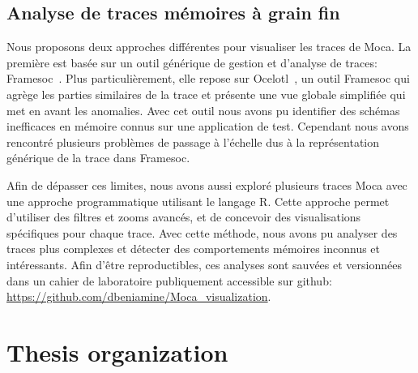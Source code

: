 \subsection*{Analyse de traces mémoires à grain fin}

Nous proposons deux approches différentes pour visualiser les traces de \gls{Moca}.
La première est basée sur un outil générique de gestion et d'analyse de traces: \gls{Framesoc}~\cite{Pagano14frameSoC}.
Plus particulièrement, elle repose sur \gls{Ocelotl}~\cite{Dosimont14Ocelotl}, un outil \gls{Framesoc} qui agrège les parties similaires de la trace et présente une vue globale simplifiée qui met en avant les anomalies.
Avec cet outil nous avons pu identifier des schémas inefficaces en mémoire connus sur une application de test.
Cependant nous avons rencontré plusieurs problèmes de passage à l'échelle dus à la représentation générique de la trace dans \gls{Framesoc}.

Afin de dépasser ces limites, nous avons aussi exploré plusieurs traces \gls{Moca} avec une approche programmatique utilisant le langage \gls{R}.
Cette approche permet d'utiliser des filtres et zooms avancés, et de concevoir des visualisations spécifiques pour chaque trace.
Avec cette méthode, nous avons pu analyser des traces plus complexes et détecter des comportements mémoires inconnus et intéressants.
Afin d'être reproductibles, ces analyses sont sauvées et versionnées dans un cahier de laboratoire publiquement accessible sur github:\\
\url{https://github.com/dbeniamine/Moca_visualization}.

\section*{Thesis organization}

